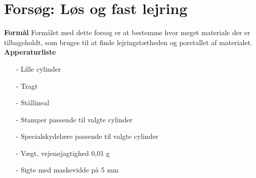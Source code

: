 \chapter{Forsøg: Løs og fast lejring}

\textbf{Formål}
\newline
Formålet med dette forsøg er at bestemme hvor meget materiale der er tilbageholdt, som bruges til at finde lejringstætheden og poretallet af materialet.
\newline
\newline
\textbf{Apperaturliste}
\begin{itemize}
	\item[-] Lille cylinder
	\item[-] Tragt
	\item[-] Stållineal
	\item[-] Stamper passende til valgte cylinder
	\item[-] Specialskydelære passende til valgte cylinder
	\item[-] Vægt, vejenøjagtighed 0,01 g
	\item[-] Sigte med maskevidde på 5 mm 
\end{itemize}

